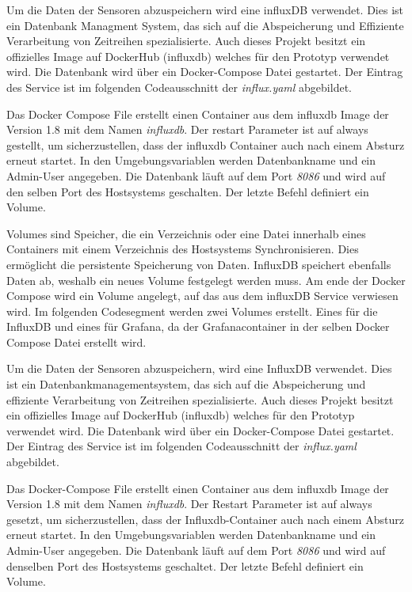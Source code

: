 \documentclass[a4paper, 12pt, oneside, toc=listofnumbered, bibliography=totoc]{scrbook}
\begin{document}
		Um die Daten der Sensoren abzuspeichern wird eine influxDB verwendet. Dies ist ein Datenbank Managment System, das sich auf die Abspeicherung und Effiziente Verarbeitung von Zeitreihen spezialisierte. Auch dieses Projekt besitzt ein offizielles Image auf DockerHub (influxdb) welches für den Prototyp verwendet wird. Die Datenbank wird über ein Docker-Compose Datei gestartet. Der Eintrag des Service ist im folgenden Codeausschnitt der \textit{influx.yaml} abgebildet.
		
		
		
		Das Docker Compose File erstellt einen Container aus dem influxdb Image der Version 1.8 mit dem Namen \textit{influxdb}. Der restart Parameter ist auf always gestellt, um sicherzustellen, dass der influxdb Container auch nach einem Absturz erneut startet. In den Umgebungsvariablen werden Datenbankname und ein Admin-User angegeben. Die Datenbank läuft auf dem Port \textit{8086} und wird auf den selben Port des Hostsystems geschalten. Der letzte Befehl definiert ein Volume. 
		
		Volumes sind Speicher, die ein Verzeichnis oder eine Datei innerhalb eines Containers mit einem Verzeichnis des Hostsystems Synchronisieren. Dies ermöglicht die persistente Speicherung von Daten. InfluxDB speichert ebenfalls Daten ab, weshalb ein neues Volume festgelegt werden muss. Am ende der Docker Compose wird ein Volume angelegt, auf das aus dem influxDB Service verwiesen wird. Im folgenden Codesegment werden zwei Volumes erstellt. Eines für die InfluxDB und eines für Grafana, da der Grafanacontainer in der selben Docker Compose Datei erstellt wird.
		
		
		
		Um die Daten der Sensoren abzuspeichern, wird eine InfluxDB verwendet. Dies ist ein Datenbankmanagementsystem, das sich auf die Abspeicherung und effiziente Verarbeitung von Zeitreihen spezialisierte. Auch dieses Projekt besitzt ein offizielles Image auf DockerHub (influxdb) welches für den Prototyp verwendet wird. Die Datenbank wird über ein Docker-Compose Datei gestartet. Der Eintrag des Service ist im folgenden Codeausschnitt der \textit{influx.yaml} abgebildet.
		
		
		
		Das Docker-Compose File erstellt einen Container aus dem influxdb Image der Version 1.8 mit dem Namen \textit{influxdb}. Der Restart Parameter ist auf always gesetzt, um sicherzustellen, dass der Influxdb-Container auch nach einem Absturz erneut startet. In den Umgebungsvariablen werden Datenbankname und ein Admin-User angegeben. Die Datenbank läuft auf dem Port \textit{8086} und wird auf denselben Port des Hostsystems geschaltet. Der letzte Befehl definiert ein Volume. 
		
\end{document}
